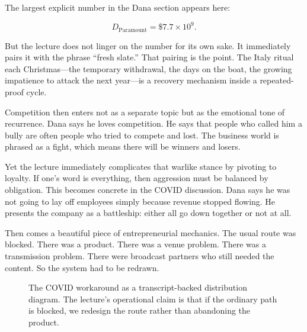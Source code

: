 The largest explicit number in the Dana section appears here:

\begin{equation}
D_{\mathrm{Paramount}} = \$7.7\times 10^9.
\end{equation}

But the lecture does not linger on the number for its own sake. It immediately pairs it with the phrase ``fresh slate.'' That pairing is the point. The Italy ritual each Christmas---the temporary withdrawal, the days on the boat, the growing impatience to attack the next year---is a recovery mechanism inside a repeated-proof cycle.

Competition then enters not as a separate topic but as the emotional tone of recurrence. Dana says he loves competition. He says that people who called him a bully are often people who tried to compete and lost. The business world is phrased as a fight, which means there will be winners and losers.

Yet the lecture immediately complicates that warlike stance by pivoting to loyalty. If one's word is everything, then aggression must be balanced by obligation. This becomes concrete in the COVID discussion. Dana says he was not going to lay off employees simply because revenue stopped flowing. He presents the company as a battleship: either all go down together or not at all.

Then comes a beautiful piece of entrepreneurial mechanics. The usual route was blocked. There was a product. There was a venue problem. There was a transmission problem. There were broadcast partners who still needed the content. So the system had to be redrawn.

\begin{figure}[h]
\centering
{}
\caption{The COVID workaround as a transcript-backed distribution diagram. The lecture's operational claim is that if the ordinary path is blocked, we redesign the route rather than abandoning the product.}
\end{figure}

